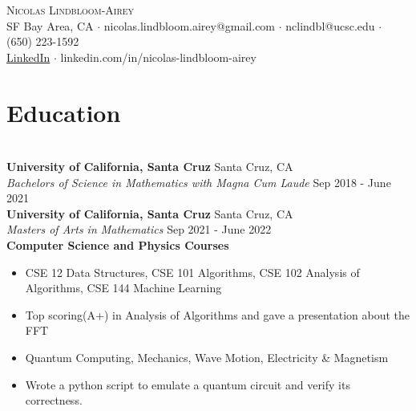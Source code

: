 \documentclass[10pt,letterpaper]{article}
\begin{document}
\vspace*{-40pt}
\begin{center}{\Huge \scshape {Nicolas Lindbloom-Airey}}\\
SF Bay Area, CA $\cdot$ nicolas.lindbloom.airey@gmail.com $\cdot$
nclindbl@ucsc.edu $\cdot$ (650) 223-1592\\
\href{https://www.linkedin.com/in/nicolas-lindbloom-airey/}{LinkedIn} $\cdot$
linkedin.com/in/nicolas-lindbloom-airey
\end{center}

\section*{Education} \vspace*{-18pt} \hrulefill \\
\textbf{University of California, Santa Cruz}   \hfill  Santa Cruz, CA\\
\textit{Bachelors of Science in Mathematics with Magna Cum Laude}           \hfill  Sep 2018 - June 2021\\

\noindent
\textbf{University of California, Santa Cruz}   \hfill  Santa Cruz, CA\\
\textit{Masters of Arts in Mathematics}            \hfill  Sep 2021 - June 2022\\

\vspace*{-8pt} 
\noindent
\textbf{Computer Science and Physics Courses}
\begin{itemize} \itemsep -1mm
\vspace*{-6pt} 
    \item CSE 12 Data Structures, CSE 101 Algorithms, CSE 102 Analysis of Algorithms, 
    CSE 144 Machine Learning
    \item Top scoring(A+) in Analysis of Algorithms and gave a presentation about the FFT
    \item Quantum Computing, Mechanics, Wave Motion,
    Electricity \& Magnetism
    \item Wrote a python script to emulate a quantum circuit and verify its correctness.
\end{itemize}

\vspace*{-10pt}
\end{document}

